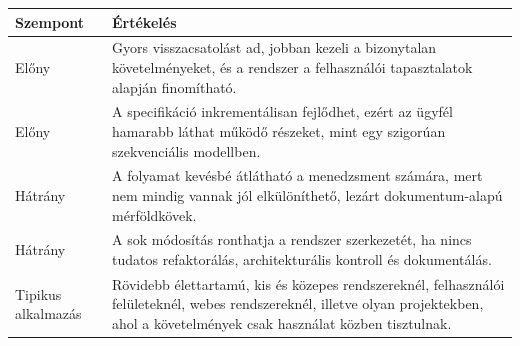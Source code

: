 \begin{tabularx}{\textwidth}{L{24mm}X}
\toprule
\textbf{Szempont} & \textbf{Értékelés} \\
\midrule
Előny & Gyors visszacsatolást ad, jobban kezeli a bizonytalan követelményeket, és a rendszer a felhasználói tapasztalatok alapján finomítható. \\
Előny & A specifikáció inkrementálisan fejlődhet, ezért az ügyfél hamarabb láthat működő részeket, mint egy szigorúan szekvenciális modellben. \\
Hátrány & A folyamat kevésbé átlátható a menedzsment számára, mert nem mindig vannak jól elkülöníthető, lezárt dokumentum-alapú mérföldkövek. \\
Hátrány & A sok módosítás ronthatja a rendszer szerkezetét, ha nincs tudatos refaktorálás, architekturális kontroll és dokumentálás. \\
Tipikus alkalmazás & Rövidebb élettartamú, kis és közepes rendszereknél, felhasználói felületeknél, webes rendszereknél, illetve olyan projektekben, ahol a követelmények csak használat közben tisztulnak. \\
\bottomrule
\end{tabularx}
